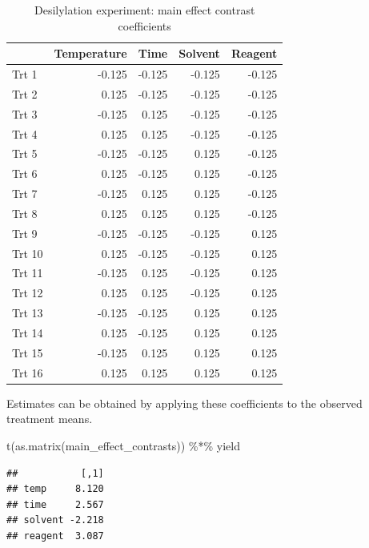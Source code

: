 \documentclass[
]{book}
\newenvironment{Shaded}{\begin{snugshade}}{\end{snugshade}}
\newcommand{\FunctionTok}[1]{\textcolor[rgb]{0.00,0.00,0.00}{#1}}
\newcommand{\NormalTok}[1]{#1}
\newcommand{\SpecialCharTok}[1]{\textcolor[rgb]{0.00,0.00,0.00}{#1}}
\theoremstyle{definition}
\theoremstyle{definition}
\theoremstyle{definition}
\theoremstyle{definition}
\theoremstyle{remark}
\begin{document}
\begin{table}

\caption{\label{tab:desilylation-all-me-contrasts}Desilylation experiment: main effect contrast coefficients}
\centering
\begin{tabular}[t]{l|r|r|r|r}
\hline
  & Temperature & Time & Solvent & Reagent\\
\hline
Trt 1 & -0.125 & -0.125 & -0.125 & -0.125\\
\hline
Trt 2 & 0.125 & -0.125 & -0.125 & -0.125\\
\hline
Trt 3 & -0.125 & 0.125 & -0.125 & -0.125\\
\hline
Trt 4 & 0.125 & 0.125 & -0.125 & -0.125\\
\hline
Trt 5 & -0.125 & -0.125 & 0.125 & -0.125\\
\hline
Trt 6 & 0.125 & -0.125 & 0.125 & -0.125\\
\hline
Trt 7 & -0.125 & 0.125 & 0.125 & -0.125\\
\hline
Trt 8 & 0.125 & 0.125 & 0.125 & -0.125\\
\hline
Trt 9 & -0.125 & -0.125 & -0.125 & 0.125\\
\hline
Trt 10 & 0.125 & -0.125 & -0.125 & 0.125\\
\hline
Trt 11 & -0.125 & 0.125 & -0.125 & 0.125\\
\hline
Trt 12 & 0.125 & 0.125 & -0.125 & 0.125\\
\hline
Trt 13 & -0.125 & -0.125 & 0.125 & 0.125\\
\hline
Trt 14 & 0.125 & -0.125 & 0.125 & 0.125\\
\hline
Trt 15 & -0.125 & 0.125 & 0.125 & 0.125\\
\hline
Trt 16 & 0.125 & 0.125 & 0.125 & 0.125\\
\hline
\end{tabular}
\end{table}

Estimates can be obtained by applying these coefficients to the observed treatment means.

\begin{Shaded}
\begin{Highlighting}[]
\FunctionTok{t}\NormalTok{(}\FunctionTok{as.matrix}\NormalTok{(main\_effect\_contrasts)) }\SpecialCharTok{\%*\%}\NormalTok{ yield}
\end{Highlighting}
\end{Shaded}

\begin{verbatim}
##           [,1]
## temp     8.120
## time     2.567
## solvent -2.218
## reagent  3.087
\end{verbatim}
\end{document}
